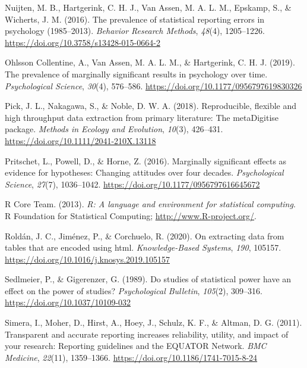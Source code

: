 \documentclass[
  12pt,
]{article}
\begin{document}
\leavevmode\hypertarget{ref-Nuijten2016}{}%
Nuijten, M. B., Hartgerink, C. H. J., Van Assen, M. A. L. M., Epskamp,
S., \& Wicherts, J. M. (2016). The prevalence of statistical reporting
errors in psychology (1985--2013). \emph{Behavior Research Methods},
\emph{48}(4), 1205--1226.
\url{https://doi.org/10.3758/s13428-015-0664-2}

\leavevmode\hypertarget{ref-OhlssonCollentine}{}%
Ohlsson Collentine, A., Van Assen, M. A. L. M., \& Hartgerink, C. H. J.
(2019). The prevalence of marginally significant results in psychology
over time. \emph{Psychological Science}, \emph{30}(4), 576--586.
\url{https://doi.org/10.1177/0956797619830326}

\leavevmode\hypertarget{ref-Pick}{}%
Pick, J. L., Nakagawa, S., \& Noble, D. W. A. (2018). Reproducible,
flexible and high throughput data extraction from primary literature:
The metaDigitise package. \emph{Methods in Ecology and Evolution},
\emph{10}(3), 426--431. \url{https://doi.org/10.1111/2041-210X.13118}

\leavevmode\hypertarget{ref-Pritschet}{}%
Pritschet, L., Powell, D., \& Horne, Z. (2016). Marginally significant
effects as evidence for hypotheses: Changing attitudes over four
decades. \emph{Psychological Science}, \emph{27}(7), 1036--1042.
\url{https://doi.org/10.1177/0956797616645672}

\leavevmode\hypertarget{ref-Rstats}{}%
R Core Team. (2013). \emph{R: A language and environment for statistical
computing}. R Foundation for Statistical Computing;
\url{http://www.R-project.org/}.

\leavevmode\hypertarget{ref-Roldan}{}%
Roldán, J. C., Jiménez, P., \& Corchuelo, R. (2020). On extracting data
from tables that are encoded using html. \emph{Knowledge-Based Systems},
\emph{190}, 105157. \url{https://doi.org/10.1016/j.knosys.2019.105157}

\leavevmode\hypertarget{ref-Sedlmeier}{}%
Sedlmeier, P., \& Gigerenzer, G. (1989). Do studies of statistical power
have an effect on the power of studies? \emph{Psychological Bulletin},
\emph{105}(2), 309--316. \url{https://doi.org/10.1037/10109-032}

\leavevmode\hypertarget{ref-Simera}{}%
Simera, I., Moher, D., Hirst, A., Hoey, J., Schulz, K. F., \& Altman, D.
G. (2011). Transparent and accurate reporting increases reliability,
utility, and impact of your research: Reporting guidelines and the
EQUATOR Network. \emph{BMC Medicine}, \emph{22}(11), 1359--1366.
\url{https://doi.org/10.1186/1741-7015-8-24}
\end{document}
